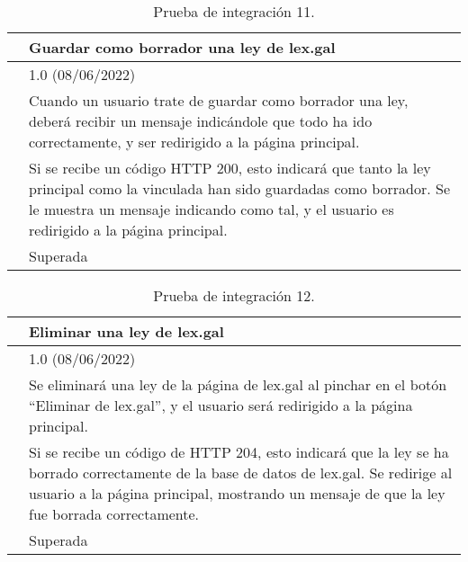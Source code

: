 \begin{table}[H]
\begin{center}
\begin{tabular}{|p{3cm}|p{10cm}|} \hline
\centering {\bf PI-11} & Guardar como borrador una ley de lex.gal  \\ \hline\hline
\centering {\bf Versión} & 1.0 (08/06/2022) \\ \hline
\centering {\bf Descripción} & Cuando un usuario trate de guardar como borrador una ley, deberá recibir un mensaje indicándole que todo ha ido correctamente, y ser redirigido a la página principal. \\ \hline
\centering {\bf Criterio de aceptación} & Si se recibe un código HTTP 200, esto indicará que tanto la ley principal como la vinculada han sido guardadas como borrador. Se le muestra un mensaje indicando como tal, y el usuario es redirigido a la página principal. \\ \hline
\centering {\bf Estado} & Superada \\ \hline
\end{tabular}
\caption{Prueba de integración 11.}
\label{enlacePI11}
\end{center}
\end{table}

\begin{table}[H]
\begin{center}
\begin{tabular}{|p{3cm}|p{10cm}|} \hline
\centering {\bf PI-12} & Eliminar una ley de lex.gal  \\ \hline\hline
\centering {\bf Versión} & 1.0 (08/06/2022) \\ \hline
\centering {\bf Descripción} & Se eliminará una ley de la página de lex.gal al pinchar en el botón ``Eliminar de lex.gal'', y el usuario será redirigido a la página principal. \\ \hline
\centering {\bf Criterio de aceptación} & Si se recibe un código de HTTP 204, esto indicará que la ley se ha borrado correctamente de la base de datos de lex.gal. Se redirige al usuario a la página principal, mostrando un mensaje de que la ley fue borrada correctamente. \\ \hline
\centering {\bf Estado} & Superada \\ \hline
\end{tabular}
\caption{Prueba de integración 12.}
\label{enlacePI12}
\end{center}
\end{table}


